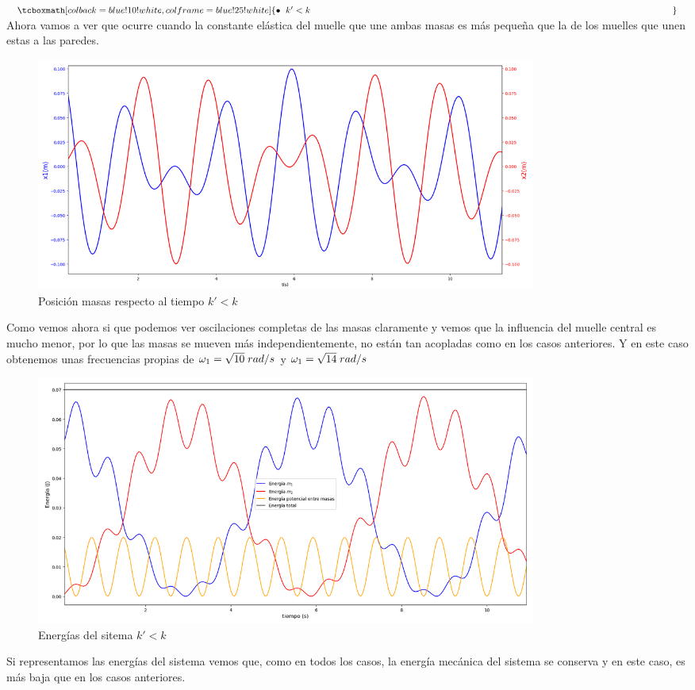 \documentclass{article}
\begin{document}
$\tcboxmath[colback=blue!10!white,colframe=blue!25!white]{\bullet\hspace{0.2cm} k'<k\hspace{14cm}}\label{ec.:4}$\newline\linebreak
Ahora vamos a ver que ocurre cuando la constante elástica del muelle que une ambas masas es más pequeña que la de los muelles que unen estas a las paredes.
\begin{figure}[H]
    \centering
    \includegraphics[width=0.8\textwidth]{posicion_k_menor}
\caption{Posición masas respecto al tiempo $k'<k$}
\label{fig:7}
\end{figure}
Como vemos ahora si que podemos ver oscilaciones completas de las masas claramente y vemos que la influencia del muelle central es mucho menor, por lo que las masas se mueven más independientemente, no están tan acopladas como en los casos anteriores. Y en este caso obtenemos unas frecuencias propias de $\omega_1 = \sqrt{10}\hspace{0.1cm}rad/s$ y $\omega_1 = \sqrt{14}\hspace{0.1cm}rad/s$
\begin{figure}[H]
    \centering
    \includegraphics[width=0.8\textwidth]{energias_k_menor}
\caption{Energías del sitema $k'<k$}
\label{fig:8}
\end{figure}
Si representamos las energías del sistema vemos que, como en todos los casos, la energía mecánica del sistema se conserva y en este caso, es más baja que en los casos anteriores.\newline\linebreak
\end{document}
